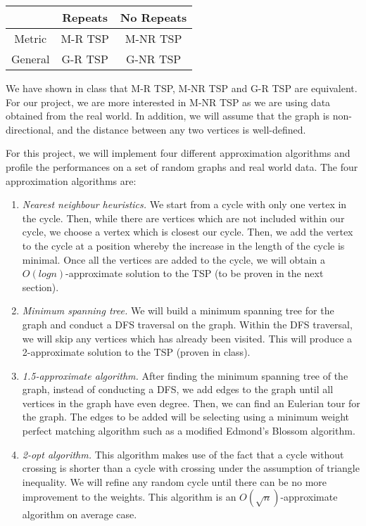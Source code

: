 \documentclass[paper=a4, fontsize=11pt]{scrartcl}	%
\numberwithin{equation}{section}		%
\numberwithin{figure}{section}			%
\numberwithin{table}{section}				%
\begin{document}
\begin{table}[h]
\centering
\begin{tabular}{|c|c|c|}
\hline
\multicolumn{1}{|l|}{} & Repeats & No Repeats \\ \hline
Metric                 & M-R TSP & M-NR TSP   \\ \hline
General                & G-R TSP & G-NR TSP   \\ \hline
\end{tabular}
\end{table}

We have shown in class that M-R TSP, M-NR TSP and G-R TSP are equivalent. For our project, we are more interested in M-NR TSP as we are using data obtained from the real world. In addition, we will assume that the graph is non-directional, and the distance between any two vertices is well-defined. 

For this project, we will implement four different approximation algorithms and profile the performances on a set of random graphs and real world data. The four approximation algorithms are:
\begin{enumerate}
\item \textit{Nearest neighbour heuristics.} We start from a cycle with only one vertex in the cycle. Then, while there are vertices which are not included within our cycle, we choose a vertex which is closest our cycle. Then, we add the vertex to the cycle at a position whereby the increase in the length of the cycle is minimal. Once all the vertices are added to the cycle, we will obtain a $O(log n)$-approximate solution to the TSP (to be proven in the next section).  
\item \textit{Minimum spanning tree.} We will build a minimum spanning tree for the graph and conduct a DFS traversal on the graph. Within the DFS traversal, we will skip any vertices which has already been visited. This will produce a 2-approximate solution to the TSP (proven in class).
\item \textit{1.5-approximate algorithm.} After finding the minimum spanning tree of the graph, instead of conducting a DFS, we add edges to the graph until all vertices in the graph have even degree. Then, we can find an Eulerian tour for the graph. The edges to be added will be selecting using a minimum weight perfect matching algorithm such as a modified Edmond's Blossom algorithm.\cite{kolmogorov}
\item \textit{2-opt algorithm.} This algorithm makes use of the fact that a cycle without crossing is shorter than a cycle with crossing under the assumption of triangle inequality. We will refine any random cycle until there can be no more improvement to the weights. This algorithm is an $O(\sqrt{n})$-approximate algorithm on average case. \cite{christian}
\end{enumerate}
\end{document}
